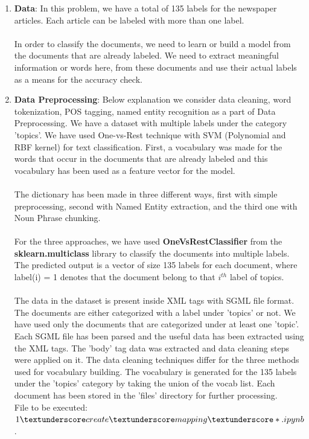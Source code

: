 \documentclass[fleqn,10pt]{SelfArx} %
\begin{document}
\begin{enumerate}
\item
\textbf{Data}: In this problem, we have a total of 135 labels for the newspaper articles. Each article can be labeled with more than one label.
\\\\In order to classify the documents, we need to learn or build a model from the documents that are already labeled. We need to extract meaningful information or words here, from these documents and use their actual labels as a means for the accuracy check.
\item \textbf{Data Preprocessing}:
Below explanation we consider data cleaning, word tokenization, POS tagging, named entity recognition as a part of Data Preprocessing. We have a dataset with multiple labels under the category 'topics'. We have used One-vs-Rest technique with SVM (Polynomial and RBF kernel) for text classification. First, a vocabulary was made for the words that occur in the documents that are already labeled and this vocabulary has been used as a feature vector for the model.
\\\\The dictionary has been made in three different ways, first with simple preprocessing, second with Named Entity extraction, and the third one with Noun Phrase chunking.
\\\\For the three approaches, we have used \textbf{OneVsRestClassifier} from the \textbf{sklearn.multiclass} library to classify the documents into multiple labels. The predicted output is a vector of size 135 labels for each document, where label(i) = 1 denotes that the document belong to that $i^{th}$ label of topics.
\\\\The data in the dataset is present inside XML tags with SGML file format. The documents are either categorized with a label under 'topics' or not. We have used only the documents that are categorized under at least one 'topic'. Each SGML file has been parsed and the useful data has been extracted using the XML tags. The 'body' tag data was extracted and data cleaning steps were applied on it. The data cleaning techniques differ for the three methods used for vocabulary building. The vocabulary is generated for the 135 labels under the 'topics' category by taking the union of the vocab list. Each document has been stored in the 'files' directory for further processing.
\\File to be executed: $1\textunderscore create\textunderscore mapping\textunderscore*.ipynb$.

\end{enumerate}
\end{document}
